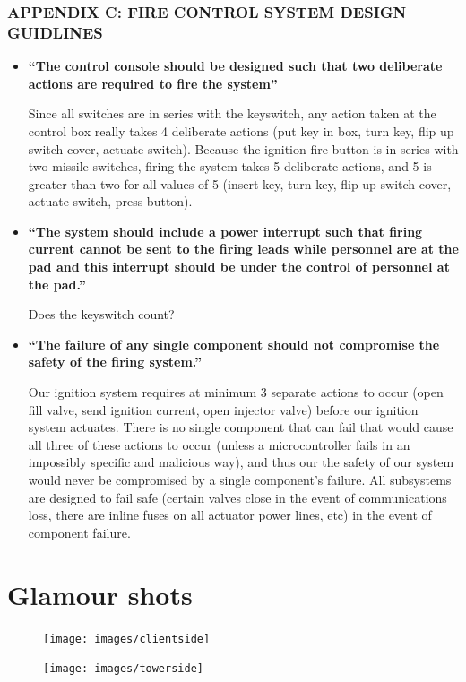 \documentclass[letter]{article}
\begin{document}
\subsubsection{APPENDIX C: FIRE CONTROL SYSTEM DESIGN GUIDLINES}
\begin{itemize}
\item {\bfseries ``The control console should be designed such that two deliberate actions are
required to fire the system''}

Since all switches are in series with the keyswitch, any action taken at the
control box really takes 4 deliberate actions (put key in box, turn key,
flip up switch cover, actuate switch). Because the ignition fire button is
in series with two missile switches, firing the system takes 5 deliberate
actions, and 5 is greater than two for all values of 5 (insert key, turn key,
flip up switch cover, actuate switch, press button).

\item {\bfseries ``The system should include a power interrupt such that firing current cannot be
sent to the firing leads while personnel are at the pad and this interrupt
should be under the control of personnel at the pad.''}

Does the keyswitch count?

\item {\bfseries ``The failure of any single component should not compromise the safety of the
firing system.''}

Our ignition system requires at minimum 3 separate actions to occur (open fill valve, send 
ignition current, open injector valve) before our ignition system actuates. There is no
single component that can fail that would cause all three of these actions to occur (unless
a microcontroller fails in an impossibly specific and malicious way), and thus our the
safety of our system would never be compromised by a single component's failure. All subsystems
are designed to fail safe (certain valves close in the event of communications loss, there
are inline fuses on all actuator power lines, etc) in the event of component failure.
\end{itemize}

\section{Glamour shots}

\begin{figure}[H]

\centering
\begin{minipage}{.36\textwidth}
  \centering
  \texttt{[image: images/clientside]}
  \label{fig:test1}
\end{minipage}%
\begin{minipage}{.64\textwidth}
  \centering
  \texttt{[image: images/towerside]}
  \label{fig:test2}
\end{minipage}

\end{figure}
\end{document}
